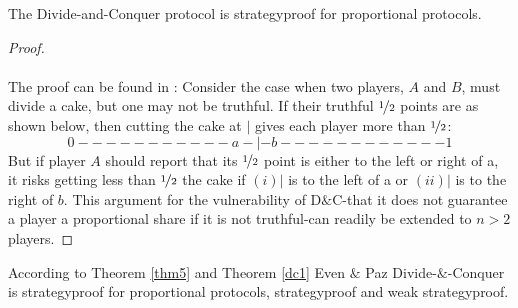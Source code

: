 \begin{lem}
\label{dc1}
The Divide-and-Conquer protocol is strategyproof for proportional protocols.
\end{lem}
\begin{proof} 
\textcolor{white}{x}\\\\
The proof can be found in \cite{dc}: Consider the case when two players, $A$ and $B$, must divide a 
cake, but one may not be truthful.  If their truthful $\nicefrac{1}{2}$ points are as shown below, then 
cutting the cake at $|$ gives each player more than $\nicefrac{1}{2}$: 
$$0-----------a-|-b------------1$$ 
But if player $A$ should report that its $\nicefrac{1}{2}$ point is either to the left or right of a, it risks 
getting less than $\nicefrac{1}{2}$ the cake if $(i) |$ is to the left of a or $(ii) |$ is to the right of $b$.  This argument for the vulnerability of D$\&$C-that it does not guarantee a player a proportional 
share if it is not truthful-can readily be extended to $n > 2$ players.
\end{proof}
\begin{bezeichnungen}
According to Theorem \ref{thm5} and Theorem \ref{dc1} %
Even $\&$ Paz Divide-$\&$-Conquer is strategyproof for proportional protocols, strategyproof %
 and weak strategyproof.
\end{bezeichnungen}
\newpage
